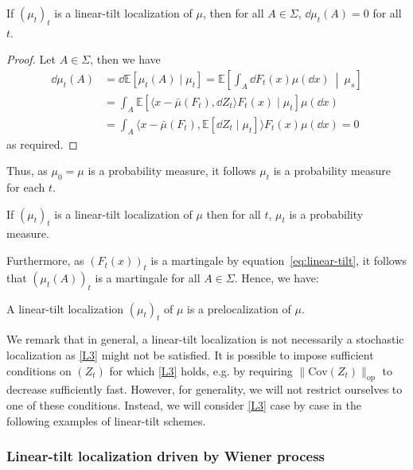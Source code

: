 \begin{proposition}
  If \((\mu_t)_t\) is a linear-tilt localization of \(\mu\), then for all \(A \in \Sigma\), 
  \(\dd \mu_t(A) = 0\) for all \(t\).
\end{proposition}
\begin{proof}
  Let \(A \in \Sigma\), then we have
  \begin{align*}
    \dd \mu_t(A) & = \dd \mathbb{E}[\mu_t(A) \mid \mu_t] = \mathbb{E}\left[\int_A \dd F_t(x) \mu(\dd x)\ \middle\vert \ \mu_s\right]\\
    & = \int_A \mathbb{E}[\langle x - \bar{\mu}(F_t), \dd Z_t \rangle F_t(x) \mid \mu_t] \mu(\dd x)\\
    & =  \int_A \langle x - \bar{\mu}(F_t), \mathbb{E}[\dd Z_t \mid \mu_t]\rangle F_t(x) \mu(\dd x) = 0
  \end{align*}
  as required.
\end{proof}

Thus, as \(\mu_0 = \mu\) is a probability measure, it follows \(\mu_t\) is a probability measure for each \(t\).

\begin{corollary}
  If \((\mu_t)_t\) is a linear-tilt localization of \(\mu\) then for all \(t\), \(\mu_t\) is a probability measure. 
\end{corollary}

Furthermore, as \((F_t(x))_t\) is a martingale by equation~\eqref{eq:linear-tilt}, it follows that \((\mu_t(A))_t\) 
is a martingale for all \(A \in \Sigma\). Hence, we have:

\begin{corollary}
  A linear-tilt localization \((\mu_t)_t\) of \(\mu\) is a prelocalization of \(\mu\).
\end{corollary}

We remark that in general, a linear-tilt localization is not necessarily a stochastic localization as \ref{L3} 
might not be satisfied. It is possible to impose sufficient conditions on \((Z_t)\) for which \ref{L3} holds,
e.g. by requiring \(\|\text{Cov}(Z_t)\|_{\text{op}}\) to decrease sufficiently fast. However, for generality, 
we will not restrict ourselves to one of these conditions. Instead, we will consider \ref{L3} case by case 
in the following examples of linear-tilt schemes. 

\subsubsection{Linear-tilt localization driven by Wiener process}\label{sec:construct}

